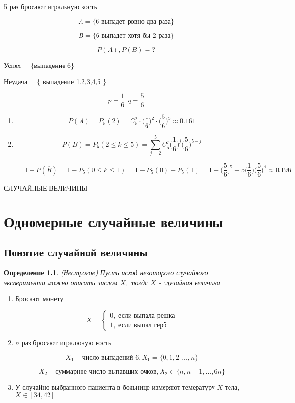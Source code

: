 \documentclass[a4paper, 14pt]{report}
\newtheorem{defenition}{Определение}[section]
\begin{document}
5 раз бросают игральную кость.

$$
A = \{ \text{6 выпадет ровно два раза} \}
$$

$$
B = \{ \text{6 выпадет хотя бы 2 раза} \}
$$

$$
P(A),P(B) = ?
$$

Успех = \{выпадение 6\}

Неудача = \{ выпадение 1,2,3,4,5 \}

$$
p = \frac{1}{6}\ \ q = \frac{5}{6}
$$

\begin{enumerate}
    \item
        $$
        P(A) = P_5(2) = C_5^2 \cdot \bigg(\frac{1}{6}\bigg)^2 \cdot \bigg(\frac{5}{6}\bigg)^3 \approx 0.161
        $$

    \item

        $$
        P(B) = P_5(2 \le k \le 5) = \sum_{j=2}^5 C_5^j \bigg(\frac{1}{6}\bigg)^j \bigg(\frac{5}{6}\bigg)^{5-j}
        $$

        $$
        = 1 - P(\overline B) = 1 - P_5(0 \le k \le 1) = 1 - P_5(0) - P_5(1) = 1 - \bigg(\frac{5}{6}\bigg)^5 - 5 \bigg(\frac{1}{6} \bigg) \bigg(\frac{5}{6}\bigg)^4 \approx 0.196
        $$
\end{enumerate}

СЛУЧАЙНЫЕ ВЕЛИЧИНЫ

\chapter{Одномерные случайные величины}

\section{Понятие случайной величины}

\begin{defenition}
    (Нестрогое) Пусть исход некоторого случайного эксперимента можно описать числом $X$, тогда $X$ - случайная величина
\end{defenition}

\begin{enumerate}
    \item Бросают монету

        $$
        X =
        \begin{cases}
            0, \text{ если выпала решка} \\
            1, \text{ если выпал герб}
        \end{cases}
        $$

    \item $n$ раз бросают игралюную кость

        $$
        X_1 - \text{число выпадений 6}, X_1 = \{0,1,2,...,n\}
        $$

        $$
        X_2 - \text{суммарное число выпавших очков}, X_2 \in \{n, n+1, ..., 6n\}
        $$

    \item У случайно выбранного пациента в больнице измеряют темературу $X$ тела, $X \in [34,42]$
\end{enumerate}
\end{document}
